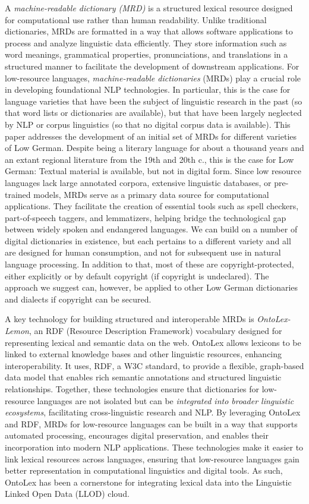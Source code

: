 \documentclass[11pt]{article}
\begin{document}
A \emph{machine-readable dictionary (MRD)} is a structured lexical resource designed for computational use rather than human readability. Unlike traditional dictionaries, MRDs are formatted in a way that allows software applications to process and analyze linguistic data efficiently. They store information such as word meanings, grammatical properties, pronunciations, and translations in a structured manner to facilitate the development of downstream applications. For low-resource languages, \emph{machine-readable dictionaries} (MRDs) play a crucial role in developing foundational NLP technologies. In particular, this is the case for language varieties that have been the subject of linguistic research in the past (so that word lists or dictionaries are available), but that have been largely neglected by NLP or corpus linguistics (so that no digital corpus data is available). This paper addresses the development of an initial set of MRDs for different varieties of Low German. 
Despite being a literary language for about a thousand years and an extant regional literature from the 19th and 20th c., this is the case for Low German: Textual material is available, but not in digital form. Since low resource languages lack large annotated corpora, extensive linguistic databases, or pre-trained models, MRDs serve as a primary data source for computational applications. They facilitate the creation of essential tools such as spell checkers, part-of-speech taggers, and lemmatizers, helping bridge the technological gap between widely spoken and endangered languages. We can build on a number of digital dictionaries in existence, but each pertains to a different variety and all are designed for human consumption, and not for subsequent use in natural language processing. In addition to that, most of these are copyright-protected, either explicitly or by default copyright (if copyright is undeclared). The approach we suggest can, however, be applied to other Low German dictionaries and dialects if copyright can be secured.
    
A key technology for building structured and interoperable MRDs is \emph{OntoLex-Lemon}, an RDF (Resource Description Framework) vocabulary  designed for representing lexical and semantic data on the web. OntoLex allows lexicons to be linked to external knowledge bases and other linguistic resources, enhancing interoperability. It uses, RDF, a W3C standard, to provide a flexible, graph-based data model that enables rich semantic annotations and structured linguistic relationships. Together, these technologies ensure that dictionaries for low-resource languages are not isolated but can be \emph{integrated into broader linguistic ecosystems}, facilitating cross-linguistic research and NLP. By leveraging OntoLex and RDF, MRDs for low-resource languages can be built in a way that supports automated processing, encourages digital preservation, and enables their incorporation into modern NLP applications. These technologies make it easier to link lexical resources across languages, ensuring that low-resource languages gain better representation in computational linguistics and digital tools. As such, OntoLex has been a cornerstone for integrating lexical data into the Linguistic Linked Open Data (LLOD) cloud. 
\end{document}
